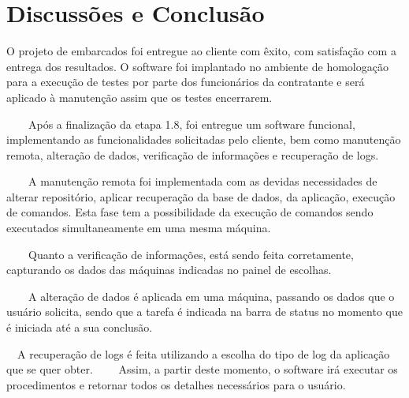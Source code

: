 \chapter[Discussões e Conclusão]{Discussões e Conclusão}
O projeto de embarcados foi entregue ao cliente com êxito, com satisfação com a entrega
dos resultados. O software foi implantado no ambiente de homologação
para a execução de testes por parte dos funcionários da contratante e será aplicado
à manutenção assim que os testes encerrarem.


{\color{black}
    \ \ \ \ Ap\'os a finaliza\c{c}\~ao da etapa 1.8, foi entregue um software funcional, implementando as funcionalidades
        solicitadas pelo cliente, bem como manuten\c{c}\~ao remota, altera\c{c}\~ao de dados, verifica\c{c}\~ao de
        informa\c{c}\~oes e recupera\c{c}\~ao de logs.}


        \bigskip

{\color{black}
    \ \ \ \ A manuten\c{c}\~ao remota foi implementada com as devidas necessidades de alterar reposit\'orio, aplicar
        recupera\c{c}\~ao da base de dados, da aplica\c{c}\~ao, execu\c{c}\~ao de comandos. Esta fase tem a possibilidade da
        execu\c{c}\~ao de comandos sendo executados simultaneamente em uma mesma m\'aquina.}


        \bigskip

{\color{black}
    \ \ \ \ Quanto a verifica\c{c}\~ao de informa\c{c}\~oes, est\'a sendo feita corretamente, capturando os dados das
        m\'aquinas indicadas no painel de escolhas. }


        \bigskip

{\color{black}
    \ \ \ \ A altera\c{c}\~ao de dados \'e aplicada em uma m\'aquina, passando os dados que o usu\'ario solicita, sendo que
        a tarefa \'e indicada na barra de status no momento que \'e iniciada at\'e a sua conclus\~ao.}


        \bigskip

{\color{black}
    \ \ A recupera\c{c}\~ao de logs \'e feita utilizando a escolha do tipo de log da aplica\c{c}\~ao que se quer obter.
        \ \ \ \ Assim, a partir deste momento, o software ir\'a executar os procedimentos e retornar todos os detalhes
        necess\'arios para o usu\'ario.}



